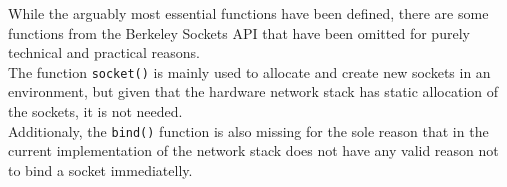 While the arguably most essential functions have been defined, there are some 
functions from the Berkeley Sockets API that have been omitted for purely 
technical and practical reasons.\\
The function \texttt{socket()} is mainly used to allocate and create new sockets 
in an environment, but given that the hardware network stack has static allocation
of the sockets, it is not needed.\\
Additionaly, the \texttt{bind()} function is also missing for the sole reason 
that in the current implementation of the network stack does not have any valid 
reason not to bind a socket immediatelly.




